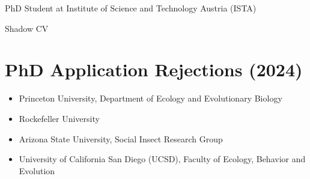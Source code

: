 \documentclass[letterpaper,11pt]{article}
\begin{document}

\begin{center}
PhD Student at Institute of Science and Technology Austria (ISTA)
\end{center}
\begin{center}
Shadow CV
\end{center}


\section{PhD Application Rejections (2024)}

\begin{itemize}
    \item Princeton University, Department of Ecology and Evolutionary Biology
    \item Rockefeller University
    \item Arizona State University, Social Insect Research Group
    \item University of California San Diego (UCSD), Faculty of Ecology, Behavior and Evolution 
\end{itemize}
\end{document}
